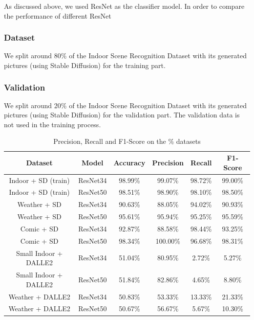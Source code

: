 \documentclass[11pt]{article}
\begin{document}
As discussed above, we used ResNet as the classifier model. In order to compare the performance of different ResNet

\subsubsection{Dataset}

We split around 80\% of the Indoor Scene Recognition Dataset with its generated pictures (using Stable Diffusion) for the training part.

\subsubsection{Validation}

We split around 20\% of the Indoor Scene Recognition Dataset with its generated pictures (using Stable Diffusion) for the validation part. The validation data is not used in the training process.
\begin{table}
  \centering
  \begin{tabular}{c|c||c|c|c|c}
    \hline
    \textbf{Dataset}      & \textbf{Model} & \textbf{Accuracy} & \textbf{Precision} & \textbf{Recall} & \textbf{F1-Score} \\
    \hline
    Indoor + SD (train)   & ResNet34       & {98.99\%}         & {99.07\%}          & {98.72\%}       & {99.00\%}         \\
    Indoor + SD (train)   & ResNet50       & {98.51\%}         & {98.90\%}          & {98.10\%}       & {98.50\%}         \\
    \hline
    Weather + SD          & ResNet34       & {90.63\%}         & {88.05\%}          & {94.02\%}       & {90.93\%}         \\
    Weather + SD          & ResNet50       & {95.61\%}         & {95.94\%}          & {95.25\%}       & {95.59\%}         \\
    Comic + SD            & ResNet34       & {92.87\%}         & {88.58\%}          & {98.44\%}       & {93.25\%}         \\
    Comic + SD            & ResNet50       & {98.34\%}         & {100.00\%}         & {96.68\%}       & {98.31\%}         \\
    Small Indoor + DALLE2 & ResNet34       & {51.04\%}         & {80.95\%}          & {2.72\%}        & {5.27\%}          \\
    Small Indoor + DALLE2 & ResNet50       & {51.84\%}         & {82.86\%}          & {4.65\%}        & {8.80\%}          \\
    Weather + DALLE2      & ResNet34       & {50.83\%}         & {53.33\%}          & {13.33\%}       & {21.33\%}         \\
    Weather + DALLE2      & ResNet50       & {50.67\%}         & {56.67\%}          & {5.67\%}        & {10.30\%}         \\
    \hline
  \end{tabular}
  \caption{Precision, Recall and F1-Score on the \% datasets}
  \label{tab:results-on-datasets}
\end{table}
\end{document}
